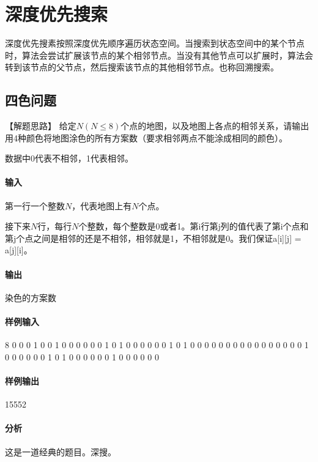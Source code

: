 \chapter{深度优先搜索}
深度优先搜素按照深度优先顺序遍历状态空间。当搜索到状态空间中的某个节点时，算法会尝试扩展该节点的某个相邻节点。当没有其他节点可以扩展时，算法会转到该节点的父节点，然后搜索该节点的其他相邻节点。也称回溯搜索。

\section{四色问题} %

【解题思路】
给定$N(N \leq 8)$个点的地图，以及地图上各点的相邻关系，请输出用4种颜色将地图涂色的所有方案数（要求相邻两点不能涂成相同的颜色）。

数据中0代表不相邻，1代表相邻。

\subsubsection{输入}
第一行一个整数$N$，代表地图上有$N$个点。

接下来$N$行，每行$N$个整数，每个整数是0或者1。第i行第j列的值代表了第i个点和第j个点之间是相邻的还是不相邻，相邻就是1，不相邻就是0。我们保证a[i][j] = a[j][i]。

\subsubsection{输出}
染色的方案数

\subsubsection{样例输入}
\begin{Code}
8
0 0 0 1 0 0 1 0 
0 0 0 0 0 1 0 1 
0 0 0 0 0 0 1 0 
1 0 0 0 0 0 0 0 
0 0 0 0 0 0 0 0 
0 1 0 0 0 0 0 0 
1 0 1 0 0 0 0 0 
0 1 0 0 0 0 0 0
\end{Code}

\subsubsection{样例输出}
\begin{Code}
15552
\end{Code}

\subsubsection{分析}
这是一道经典的题目。深搜。


